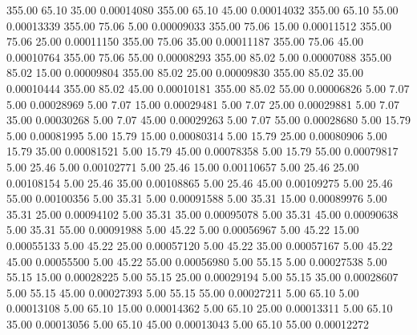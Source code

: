     355.00     65.10     35.00     0.00014080
    355.00     65.10     45.00     0.00014032
    355.00     65.10     55.00     0.00013339
    355.00     75.06      5.00     0.00009033
    355.00     75.06     15.00     0.00011512
    355.00     75.06     25.00     0.00011150
    355.00     75.06     35.00     0.00011187
    355.00     75.06     45.00     0.00010764
    355.00     75.06     55.00     0.00008293
    355.00     85.02      5.00     0.00007088
    355.00     85.02     15.00     0.00009804
    355.00     85.02     25.00     0.00009830
    355.00     85.02     35.00     0.00010444
    355.00     85.02     45.00     0.00010181
    355.00     85.02     55.00     0.00006826
      5.00      7.07      5.00     0.00028969
      5.00      7.07     15.00     0.00029481
      5.00      7.07     25.00     0.00029881
      5.00      7.07     35.00     0.00030268
      5.00      7.07     45.00     0.00029263
      5.00      7.07     55.00     0.00028680
      5.00     15.79      5.00     0.00081995
      5.00     15.79     15.00     0.00080314
      5.00     15.79     25.00     0.00080906
      5.00     15.79     35.00     0.00081521
      5.00     15.79     45.00     0.00078358
      5.00     15.79     55.00     0.00079817
      5.00     25.46      5.00     0.00102771
      5.00     25.46     15.00     0.00110657
      5.00     25.46     25.00     0.00108154
      5.00     25.46     35.00     0.00108865
      5.00     25.46     45.00     0.00109275
      5.00     25.46     55.00     0.00100356
      5.00     35.31      5.00     0.00091588
      5.00     35.31     15.00     0.00089976
      5.00     35.31     25.00     0.00094102
      5.00     35.31     35.00     0.00095078
      5.00     35.31     45.00     0.00090638
      5.00     35.31     55.00     0.00091988
      5.00     45.22      5.00     0.00056967
      5.00     45.22     15.00     0.00055133
      5.00     45.22     25.00     0.00057120
      5.00     45.22     35.00     0.00057167
      5.00     45.22     45.00     0.00055500
      5.00     45.22     55.00     0.00056980
      5.00     55.15      5.00     0.00027538
      5.00     55.15     15.00     0.00028225
      5.00     55.15     25.00     0.00029194
      5.00     55.15     35.00     0.00028607
      5.00     55.15     45.00     0.00027393
      5.00     55.15     55.00     0.00027211
      5.00     65.10      5.00     0.00013108
      5.00     65.10     15.00     0.00014362
      5.00     65.10     25.00     0.00013311
      5.00     65.10     35.00     0.00013056
      5.00     65.10     45.00     0.00013043
      5.00     65.10     55.00     0.00012272

